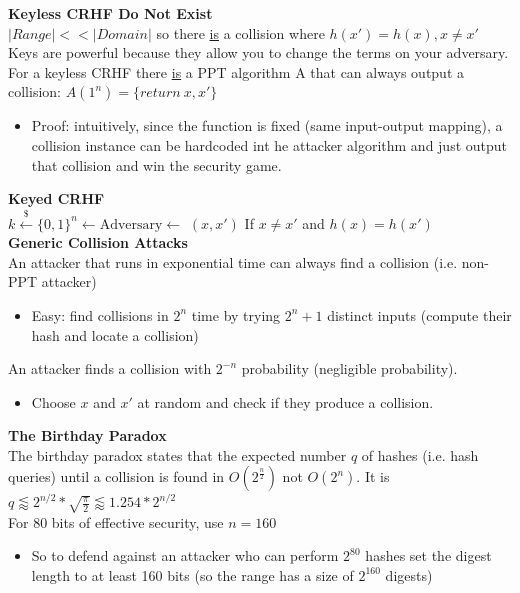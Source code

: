\documentclass{article}
\begin{document}
\textbf{Keyless CRHF Do Not Exist}\\
$|Range| << |Domain|$ so there \underline{is} a collision where $h(x')=h(x), x\neq x'$\\
Keys are powerful because they allow you to change the terms on your adversary.\\
For a keyless CRHF there \underline{is} a PPT algorithm A that can always output a collision: $A(1^n)=\{return\ x,x'\}$\begin{itemize}
	\item Proof: intuitively, since the function is fixed (same input-output mapping), a collision instance can be hardcoded int he attacker algorithm and just output that collision and win the security game.
\end{itemize}

\textbf{Keyed CRHF}\\
$k\overset{\$}{\leftarrow}\{0,1\}^n \leftarrow \mbox{Adversary} \leftarrow$ $(x,x')$ If $x\neq x'$ and $h(x)=h(x')$\\

\textbf{Generic Collision Attacks}\\
An attacker that runs in exponential time can always find a collision (i.e. non-PPT attacker)
\begin{itemize}
	\item Easy: find collisions in $2^n$ time by trying $2^n+1$ distinct inputs (compute their hash and locate a collision)
\end{itemize}
An attacker finds a collision with $2^{-n}$ probability (negligible probability).
\begin{itemize}
	\item Choose $x$ and $x'$ at random and check if they produce a collision.
\end{itemize}

\textbf{The Birthday Paradox}\\
The birthday paradox states that the expected number $q$ of hashes (i.e. hash queries) until a collision is found in $O(2^{\frac{n}{2}})$ not $O(2^n)$. It is $q\lessapprox2^{n/2}*\sqrt{\frac{\pi}{2}}\lessapprox1.254*2^{n/2}$\\
For 80 bits of effective security, use $n=160$
\begin{itemize}
	\item So to defend against an attacker who can perform $2^{80}$ hashes set the digest length to at least 160 bits (so the range has a size of $2^{160}$ digests)
\end{itemize}
\end{document}
